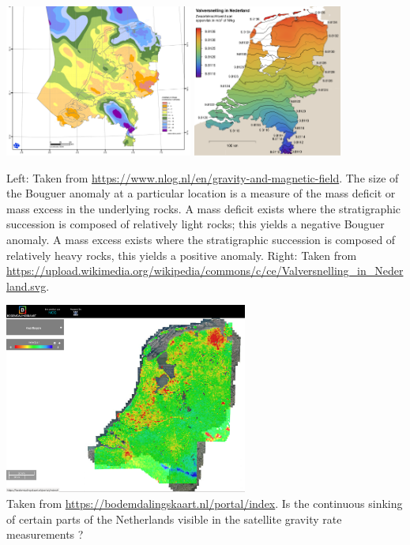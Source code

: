 \begin{center}
\includegraphics[height=5cm]{images/gravity/gravityNL}
\includegraphics[height=5cm]{images/gravity/gravityNL2}\\
{\captionfont Left: Taken from \url{https://www.nlog.nl/en/gravity-and-magnetic-field}. 
The size of the Bouguer anomaly at a particular location is a measure of the mass deficit or mass 
excess in the underlying rocks. A mass deficit  exists where  the stratigraphic succession is composed of relatively light rocks; 
this yields a negative Bouguer anomaly. A mass excess exists where the stratigraphic succession is 
composed of relatively heavy rocks, this yields a positive anomaly.
Right: Taken from \url{https://upload.wikimedia.org/wikipedia/commons/c/ce/Valversnelling_in_Nederland.svg}.

}
\end{center}

\begin{center}
\includegraphics[width=8cm]{images/gravity/bodemdaling}\\
{\captionfont Taken from \url{https://bodemdalingskaart.nl/portal/index}. Is the continuous sinking of certain parts of the Netherlands 
visible in the satellite gravity rate measurements ?}
\end{center}

